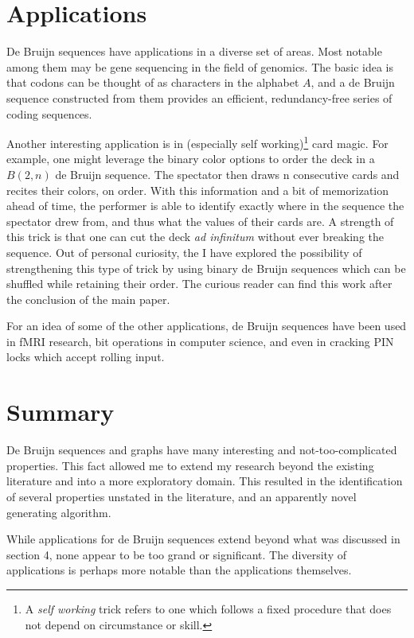 \documentclass[12pt]{article}
\newcounter{example}[section]
\begin{document}
\section{Applications}
De Bruijn sequences have applications in a diverse set of areas. Most notable among them may be gene sequencing in the field of genomics. The basic idea is that codons can be thought of as characters in the alphabet $A$, and a de Bruijn sequence constructed from them provides an efficient, redundancy-free series of coding sequences. \citep{peng_ji_zhao_2016} \par
Another interesting application is in (especially self working)\footnote{A \emph{self working} trick refers to one which follows a fixed procedure that does not depend on circumstance or skill.} card magic. For example, one might leverage the binary color options to order the deck in a $B(2,n)$ de Bruijn sequence. The spectator then draws n consecutive cards and recites their colors, on order. With this information and a bit of memorization ahead of time, the performer is able to identify exactly where in the sequence the spectator drew from, and thus what the values of their cards are. A strength of this trick is that one can cut the deck \emph{ad infinitum} without ever breaking the sequence. Out of personal curiosity, the I have explored the possibility of strengthening this type of trick by using binary de Bruijn sequences which can be shuffled while retaining their order. The curious reader can find this work after the conclusion of the main paper. \par
For an idea of some of the other applications, de Bruijn sequences have been used in fMRI research, bit operations in computer science, and even in cracking PIN locks which accept rolling input. 


\section{Summary}
De Bruijn sequences and graphs have many interesting and not-too-complicated properties. This fact allowed me to extend my research beyond the existing literature and into a more exploratory domain. This resulted in the identification of several properties unstated in the literature, and an apparently novel generating algorithm. \par
While applications for de Bruijn sequences extend beyond what was discussed in section 4, none appear to be too grand or significant. The diversity of applications is perhaps more notable than the applications themselves. 
\end{document}
